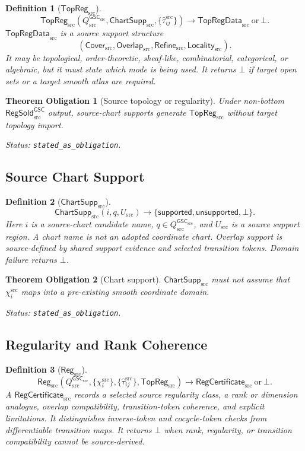 \documentclass[11pt]{article}
\newcommand{\GSC}{\mathsf{GSC}_{\mathrm{src}}}
\newcommand{\RegSold}{\mathsf{RegSold}_{\mathrm{src}}^{\mathsf{GSC}}}
\newcommand{\TopRegSrc}{\mathsf{TopReg}_{\mathrm{src}}}
\newcommand{\ChartSuppSrc}{\mathsf{ChartSupp}_{\mathrm{src}}}
\newcommand{\RegSrc}{\mathsf{Reg}_{\mathrm{src}}}
\newcommand{\Qsrc}{Q_{\mathrm{src}}^{\GSC}}
\newcommand{\Tau}{\widehat{\tau}^{\mathrm{src}}}
\newcommand{\Bot}{\bot}
\newtheorem{definition}{Definition}
\newtheorem{obligation}{Theorem Obligation}
\begin{document}
\begin{definition}[\(\TopRegSrc\)]
\[
  \TopRegSrc(\Qsrc,\ChartSuppSrc,\{\Tau_{ij}\})
  \longrightarrow
  \mathsf{TopRegData}_{\mathrm{src}}
  \ \text{or}\ \Bot .
\]
\(\mathsf{TopRegData}_{\mathrm{src}}\) is a source support structure
\[
  (\mathsf{Cover}_{\mathrm{src}},
   \mathsf{Overlap}_{\mathrm{src}},
   \mathsf{Refine}_{\mathrm{src}},
   \mathsf{Locality}_{\mathrm{src}}).
\]
It may be topological, order-theoretic, sheaf-like, combinatorial,
categorical, or algebraic, but it must state which mode is being used. It
returns \(\Bot\) if target open sets or a target smooth atlas are required.
\end{definition}

\begin{obligation}[Source topology or regularity]
Under non-bottom \(\RegSold\) output, source-chart supports generate
\(\TopRegSrc\) without target topology import.

Status: \texttt{stated\_as\_obligation}.
\end{obligation}

\subsection{Source Chart Support}

\begin{definition}[\(\ChartSuppSrc\)]
\[
  \ChartSuppSrc(i,q,U_{\mathrm{src}})
  \longrightarrow
  \{\mathsf{supported},\mathsf{unsupported},\Bot\}.
\]
Here \(i\) is a source-chart candidate name, \(q\in\Qsrc\), and
\(U_{\mathrm{src}}\) is a source support region. A chart name is not an
adopted coordinate chart. Overlap support is source-defined by shared support
evidence and selected transition tokens. Domain failure returns \(\Bot\).
\end{definition}

\begin{obligation}[Chart support]
\(\ChartSuppSrc\) must not assume that \(\chi_i^{\mathrm{src}}\) maps into a
pre-existing smooth coordinate domain.

Status: \texttt{stated\_as\_obligation}.
\end{obligation}

\subsection{Regularity and Rank Coherence}

\begin{definition}[\(\RegSrc\)]
\[
  \RegSrc(\Qsrc,\{\chi_i^{\mathrm{src}}\},\{\Tau_{ij}\},\TopRegSrc)
  \longrightarrow
  \mathsf{RegCertificate}_{\mathrm{src}}
  \ \text{or}\ \Bot .
\]
A \(\mathsf{RegCertificate}_{\mathrm{src}}\) records a selected source
regularity class, a rank or dimension analogue, overlap compatibility,
transition-token coherence, and explicit limitations. It distinguishes
inverse-token and cocycle-token checks from differentiable transition maps.
It returns \(\Bot\) when rank, regularity, or transition compatibility cannot
be source-derived.
\end{definition}
\end{document}
